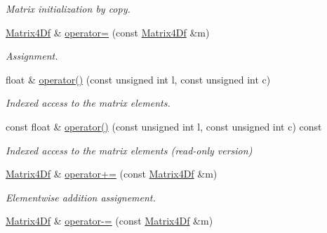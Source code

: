 \begin{DoxyCompactItemize}
\begin{DoxyCompactList}\small\item\em \-Matrix initialization by copy. \end{DoxyCompactList}\item 
\hypertarget{class_matrix4_df_a2310ba8d71b1b3077b6df339beea6f8a}{
\hyperlink{class_matrix4_df}{\-Matrix4\-Df} \& \hyperlink{class_matrix4_df_a2310ba8d71b1b3077b6df339beea6f8a}{operator=} (const \hyperlink{class_matrix4_df}{\-Matrix4\-Df} \&m)}
\label{class_matrix4_df_a2310ba8d71b1b3077b6df339beea6f8a}

\begin{DoxyCompactList}\small\item\em \-Assignment. \end{DoxyCompactList}\item 
float \& \hyperlink{class_matrix4_df_ad7e75be328ebc701a3cba9a37a424939}{operator()} (const unsigned int l, const unsigned int c)
\begin{DoxyCompactList}\small\item\em \-Indexed access to the matrix elements. \end{DoxyCompactList}\item 
const float \& \hyperlink{class_matrix4_df_a4403f205c494937bd4992dc186466026}{operator()} (const unsigned int l, const unsigned int c) const 
\begin{DoxyCompactList}\small\item\em \-Indexed access to the matrix elements (read-\/only version) \end{DoxyCompactList}\item 
\hypertarget{class_matrix4_df_a167312c1af18eaf230dff051bde772a4}{
\hyperlink{class_matrix4_df}{\-Matrix4\-Df} \& \hyperlink{class_matrix4_df_a167312c1af18eaf230dff051bde772a4}{operator+=} (const \hyperlink{class_matrix4_df}{\-Matrix4\-Df} \&m)}
\label{class_matrix4_df_a167312c1af18eaf230dff051bde772a4}

\begin{DoxyCompactList}\small\item\em \-Elementwise addition assignement. \end{DoxyCompactList}\item 
\hypertarget{class_matrix4_df_add536edec4c836d1f5a3fe02cbfd04ff}{
\hyperlink{class_matrix4_df}{\-Matrix4\-Df} \& \hyperlink{class_matrix4_df_add536edec4c836d1f5a3fe02cbfd04ff}{operator-\/=} (const \hyperlink{class_matrix4_df}{\-Matrix4\-Df} \&m)}
\label{class_matrix4_df_add536edec4c836d1f5a3fe02cbfd04ff}


\end{DoxyCompactItemize}
